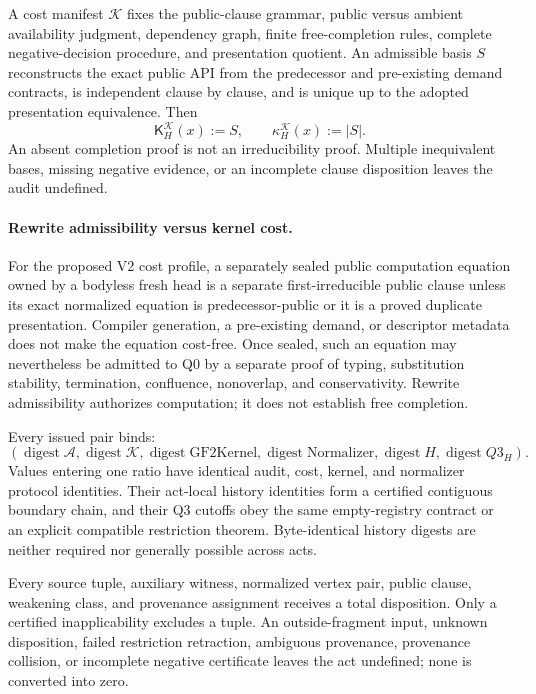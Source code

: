 \begin{definition}
A cost manifest \(\mathcal K\) fixes the public-clause grammar, public versus
ambient availability judgment, dependency graph, finite free-completion
rules, complete negative-decision procedure, and presentation quotient.
An admissible basis \(S\) reconstructs the exact public API from the
predecessor and pre-existing demand contracts, is independent clause by
clause, and is unique up to the adopted presentation equivalence.  Then
\[
  \mathsf K^{\mathcal K}_H(x):=S,
  \qquad
  \kappa^{\mathcal K}_H(x):=|S|.
\]
An absent completion proof is not an irreducibility proof.  Multiple
inequivalent bases, missing negative evidence, or an incomplete clause
disposition leaves the audit undefined.
\end{definition}

\paragraph{Rewrite admissibility versus kernel cost.}
For the proposed V2 cost profile, a separately sealed public computation
equation owned by a bodyless fresh head is a separate first-irreducible public
clause unless its exact normalized equation is predecessor-public or it is a
proved duplicate presentation.  Compiler generation, a pre-existing demand,
or descriptor metadata does not make the equation cost-free.  Once sealed,
such an equation may nevertheless be admitted to Q0 by a separate proof of
typing, substitution stability, termination, confluence, nonoverlap, and
conservativity.  Rewrite admissibility authorizes computation; it does not
establish free completion.

\begin{definition}
Every issued pair binds:
\[
  (\operatorname{digest}\mathcal A,
   \operatorname{digest}\mathcal K,
   \operatorname{digest}\mathrm{GF2Kernel},
   \operatorname{digest}\mathrm{Normalizer},
   \operatorname{digest}H,
   \operatorname{digest}Q3_H).
\]
Values entering one ratio have identical audit, cost, kernel, and normalizer
protocol identities.  Their act-local history identities form a certified
contiguous boundary chain, and their Q3 cutoffs obey the same empty-registry
contract or an explicit compatible restriction theorem.  Byte-identical
history digests are neither required nor generally possible across acts.
\end{definition}

\begin{definition}
Every source tuple, auxiliary witness, normalized vertex pair, public clause,
weakening class, and provenance assignment receives a total disposition.
Only a certified inapplicability excludes a tuple.  An outside-fragment input,
unknown disposition, failed restriction retraction, ambiguous provenance,
provenance collision, or incomplete negative certificate leaves the act
undefined; none is converted into zero.
\end{definition}

